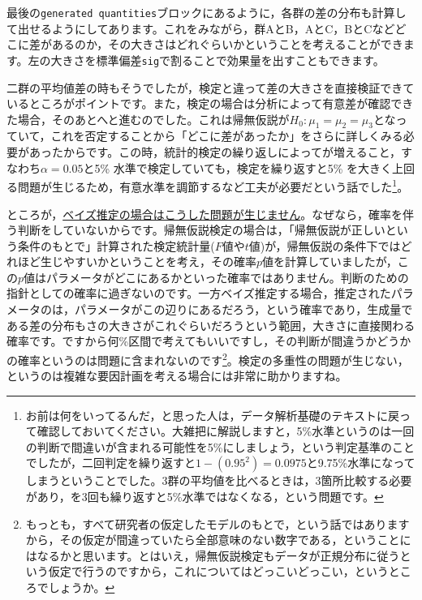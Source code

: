 \documentclass{ltjsbook}
\begin{document}
最後の\verb|generated quantities|ブロックにあるように，各群の差の分布も計算して出せるようにしてあります。これをみながら，群AとB，AとC，BとCなどどこに差があるのか，その大きさはどれぐらいかということを考えることができます。左の大きさを標準偏差\verb|sig|で割ることで効果量を出すこともできます。

二群の平均値差の時もそうでしたが，検定と違って差の大きさを直接検証できているところがポイントです。また，検定の場合は分析によって有意差が確認できた場合，そのあとへと進むのでした。これは帰無仮説が$H_0:\mu_1 = \mu_2 = \mu_3$となっていて，これを否定することから「どこに差があったか」をさらに詳しくみる必要があったからです。この時，統計的検定の繰り返しによってが増えること，すなわち$\alpha = 0.05$と5\% 水準で検定していても，検定を繰り返すと5\% を大きく上回る問題が生じるため，有意水準を調節するなど工夫が必要だという話でした\footnote{お前は何をいってるんだ，と思った人は，データ解析基礎のテキストに戻って確認しておいてください。大雑把に解説しますと，5\%水準というのは一回の判断で間違いが含まれる可能性を5\%にしましょう，という判定基準のことでしたが，二回判定を繰り返すと$1-(0.95^2)=0.0975$と9.75\%水準になってしまうということでした。3群の平均値を比べるときは，3箇所比較する必要があり，を3回も繰り返すと5\%水準ではなくなる，という問題です。}。

ところが，\underline{ベイズ推定の場合はこうした問題が生じません}。なぜなら，確率を伴う判断をしていないからです。帰無仮説検定の場合は，「帰無仮説が正しいという条件のもとで」計算された検定統計量($F$値や$t$値)が，帰無仮説の条件下ではどれほど生じやすいかということを考え，その確率$p$値を計算していましたが，この$p$値はパラメータがどこにあるかといった確率ではありません。判断のための指針としての確率に過ぎないのです。一方ベイズ推定する場合，推定されたパラメータのは，パラメータがこの辺りにあるだろう，という確率であり，生成量である差の分布もさの大きさがこれぐらいだろうという範囲，大きさに直接関わる確率です。ですから何\%区間で考えてもいいですし，その判断が間違うかどうかの確率というのは問題に含まれないのです\footnote{もっとも，すべて研究者の仮定したモデルのもとで，という話ではありますから，その仮定が間違っていたら全部意味のない数字である，ということにはなるかと思います。とはいえ，帰無仮説検定もデータが正規分布に従うという仮定で行うのですから，これについてはどっこいどっこい，というところでしょうか。}。検定の多重性の問題が生じない，というのは複雑な要因計画を考える場合には非常に助かりますね。
\end{document}

